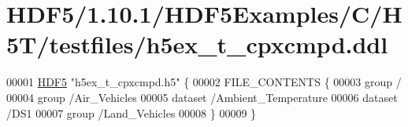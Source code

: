 \hypertarget{_h_d_f5_21_810_81_2_h_d_f5_examples_2_c_2_h5_t_2testfiles_2h5ex__t__cpxcmpd_8ddl_source}{}\section{H\+D\+F5/1.10.1/\+H\+D\+F5\+Examples/\+C/\+H5\+T/testfiles/h5ex\+\_\+t\+\_\+cpxcmpd.ddl}
\label{_h_d_f5_21_810_81_2_h_d_f5_examples_2_c_2_h5_t_2testfiles_2h5ex__t__cpxcmpd_8ddl_source}

\begin{DoxyCode}
00001 \hyperlink{namespace_h_d_f5}{HDF5} \textcolor{stringliteral}{"h5ex\_t\_cpxcmpd.h5"} \{
00002 FILE\_CONTENTS \{
00003  group      /
00004  group      /Air\_Vehicles
00005  dataset    /Ambient\_Temperature
00006  dataset    /DS1
00007  group      /Land\_Vehicles
00008  \}
00009 \}
\end{DoxyCode}
